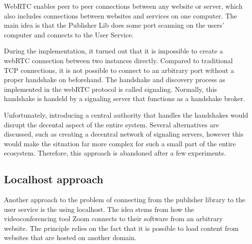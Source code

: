 WebRTC enables peer to peer connections between any website or server, which also includes connections between websites and services on one computer. The main idea is that the Publisher Lib does some port scanning on the users' computer and connects to the User Service.

During the implementation, it turned out that it is impossible to create a webRTC connection between two instances directly. Compared to traditional TCP connections, it is not possible to connect to an arbitrary port without a proper handshake on beforehand. The handshake and discovery process as implemented in the webRTC protocol is called signaling. Normally, this handshake is handeld by a signaling server that functions as a handshake broker.

Unfortunately, introducing a central authority that handles the handshakes would disrupt the decental aspect of the entire system. Several alternatives are discussed, such as creating a decentral network of signaling servers, however this would make the situation far more complex for such a small part of the entire ecosystem. Therefore, this approach is abandoned after a few experiments.

\subsection{Localhost approach}

Another approach to the problem of connecting from the publisher library to the user service is the using localhost. The idea stems from how the videoconferencing tool Zoom connects to their software from an arbitrary website. The principle relies on the fact that it is possible to load content from websites that are hosted on another domain. 
